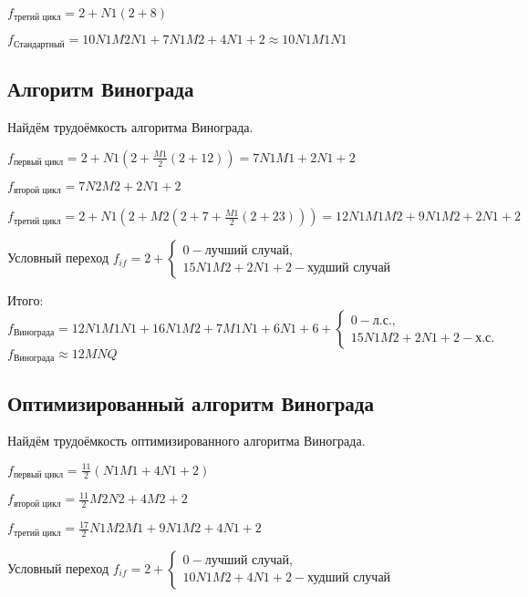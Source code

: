 \documentclass[utf8x, 12pt]{G7-32}
\begin{document}
            $ f_\text{третий цикл} = 2 + N1(2 + 8)$  

            $ f_\text{Стандартный} = 10N1M2N1 + 7N1M2 +4N1 + 2 \approx 10N1M1N1$

        \subsection{Алгоритм Винограда}
            Найдём трудоёмкость алгоритма Винограда.
            
            $ f_\text{первый цикл} = 2 + N1(2 + \frac{M1}{2}(2 + 12)) = 7N1M1 + 2N1 + 2$
            
            $ f_\text{второй цикл} = 7N2M2 + 2N1 + 2$

            $ f_\text{третий цикл} = 2 + N1(2 + M2(2 + 7 + \frac{M1}{2}(2 + 23))) = 12N1M1M2 + 9N1M2 + 2N1 + 2$

            Условный переход $f_{if} = 2 + \left\{
                \begin{matrix}
                0 - \text{лучший случай},\\
                15N1M2 + 2N1 + 2 - \text{худший случай} 
                \end{matrix}\right.$

            Итого:
            \begin{equation}
                f_\text{Винограда} = 12N1M1N1 + 16N1M2 + 7M1N1 + 6N1 + 6 +
                    \left\{ \begin{matrix}
                    0 - \text{л.с.},\\
                    15N1M2 + 2N1 + 2 - \text{х.с.} 
                    \end{matrix}\right.
            \end{equation}
            $ f_\text{Винограда} \approx 12MNQ $
        \subsection{Оптимизированный алгоритм Винограда}

            Найдём трудоёмкость оптимизированного алгоритма Винограда.
                
            $ f_\text{первый цикл} =\frac{11}{2}(N1M1 + 4N1 + 2)$
            
            $ f_\text{второй цикл} = \frac{11}{2} M2N2+ 4M2 + 2$

            $ f_\text{третий цикл} = \frac{17}{2} N1M2M1 + 9N1M2 + 4N1 + 2$

            Условный переход $f_{if} = 2 + \left\{
                \begin{matrix}
                0 - \text{лучший случай},\\
                10N1M2 + 4N1 + 2 - \text{худший случай} 
                \end{matrix}\right.$
\end{document}
